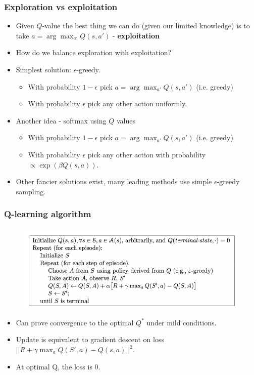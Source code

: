 \documentclass{beamer}
\renewcommand{\high}{\textbf}
\begin{document}
\begin{frame}\frametitle{Exploration vs exploitation}\small
\begin{itemize}
    \item Given $Q$-value the best thing we can do (given our limited knowledge) is to take $a=\arg\max_{a'}Q(s,a')$ - \high{exploitation}
    \item How do we balance exploration with exploitation?
    \item Simplest solution: $\epsilon$-greedy. 
    \begin{itemize}
        \item With probability $1-\epsilon$ pick $a=\arg\max_{a'}Q(s,a')$ (i.e. greedy)
        \item With probability $\epsilon$ pick any other action uniformly.
    \end{itemize} 
    \item Another idea - softmax using $Q$ values
    \begin{itemize}
        \item With probability $1-\epsilon$ pick $a=\arg\max_{a'}Q(s,a')$ (i.e. greedy)
        \item With probability $\epsilon$ pick any other action with probability $\propto\exp(\beta Q(s,a))$.
    \end{itemize} 
    \item Other fancier solutions exist, many leading methods use simple $\epsilon$-greedy sampling.
\end{itemize}
\end{frame}


\begin{frame}\frametitle{Q-learning algorithm}\small
\vspace{-0.5cm}
\begin{figure}
     \includegraphics[width=0.9\linewidth]{Figures/Qalgo}
 \end{figure}
\vspace{-0.5cm}
\begin{itemize}
    \item Can prove convergence to the optimal $Q^*$ under mild conditions.
    \item Update is equivalent to gradient descent on loss $||R+\gamma\max_a Q(S',a)-Q(s,a)||^2$.
    \item At optimal Q, the loss is 0.
\end{itemize}
\end{frame}
\end{document}
